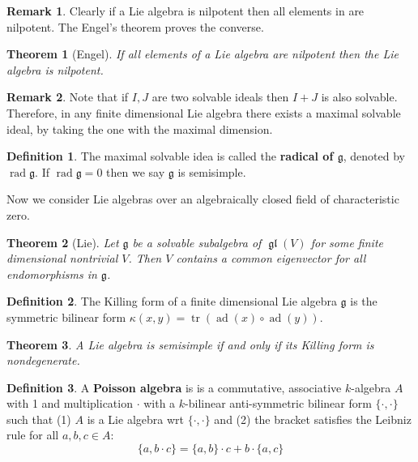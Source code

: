 \documentclass[12pt]{report}
\newtheorem{theorem}{Theorem}[section]
\theoremstyle{remark}
\theoremstyle{definition}
\newtheorem{remark}{Remark}[section]
\newtheorem{definition}{Definition}[section]
\newcommand{\rad}[0]{\operatorname{rad}}
\newcommand{\gl}{\operatorname{\mathfrak{gl}}}
\newcommand{\ad}{\operatorname{ad}}
\newcommand{\tr}{\operatorname{tr}}
\begin{document}
    \begin{remark}
        Clearly if a Lie algebra is nilpotent then all elements in are nilpotent. The Engel's theorem proves the converse.
    \end{remark}
    \begin{theorem}[Engel]
        If all elements of a Lie algebra are nilpotent then the Lie algebra is nilpotent.
    \end{theorem}
    \begin{remark}
        Note that if $I, J$ are two solvable ideals then $I+J$ is also solvable. Therefore, in any finite dimensional Lie algebra there exists a maximal solvable ideal, by taking the one with the maximal dimension.
    \end{remark}
    \begin{definition}
        The maximal solvable idea is called the \textbf{radical of $\mathfrak g$}, denoted by $\rad\mathfrak g$. If $\rad\mathfrak g=0$ then we say $\mathfrak g$ is semisimple.
    \end{definition}
    Now we consider Lie algebras over an algebraically closed field of characteristic zero.
    \begin{theorem}[Lie]
        Let $\mathfrak g$ be a solvable subalgebra of $\gl(V)$ for some finite dimensional nontrivial $V$. Then $V$ contains a common eigenvector for all endomorphisms in $\mathfrak g$.
    \end{theorem}
    \begin{definition}
        The Killing form of a finite dimensional Lie algebra $\mathfrak g$ is the symmetric bilinear form $\kappa(x, y)=\tr(\ad(x)\circ\ad(y))$.
    \end{definition}
    \begin{theorem}
        A Lie algebra is semisimple if and only if its Killing form is nondegenerate.
    \end{theorem}
    \begin{definition}
        A \textbf{Poisson algebra} is is a commutative, associative $k$-algebra $A$ with 1 and multiplication $\cdot$ with a $k$-bilinear anti-symmetric bilinear form $\{\cdot,\cdot\}$ such that (1) $A$ is a Lie algebra wrt $\{\cdot,\cdot\}$ and (2) the bracket satisfies the Leibniz rule for all $a,b,c\in A$:
        \[\{a,b\cdot c\}=\{a, b\}\cdot c+b\cdot \{a, c\}\]
    \end{definition}
\end{document}

